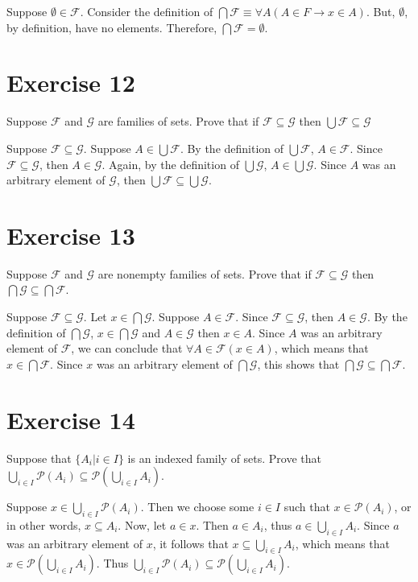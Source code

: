 \documentclass[11pt]{article}
\newcommand{\then}{\rightarrow}
\newcommand{\powerset}[1]{\mathscr{P}(#1)}
\newcommand{\family}[1]{\mathcal{#1}}
\begin{document}
Suppose $\emptyset \in \family{F}$. Consider the definition of 
$\bigcap \family{F} \equiv \forall A (A \in F \then x \in A)$. But, $\emptyset$, 
by definition, have no elements. Therefore, $\bigcap \family{F} = \emptyset$.

\section*{Exercise 12}

Suppose $\family{F}$ and $\family{G}$ are families of sets. Prove that if
$\family{F} \subseteq \family{G}$ then $\bigcup \family{F} \subseteq \family{G}$

Suppose $\family{F} \subseteq \family{G}$. Suppose $A \in \bigcup \family{F}$.
By the definition of $\bigcup \family{F}$, $A \in \family{F}$. Since 
$\family{F} \subseteq \family{G}$, then $A \in \family{G}$. Again, by the
definition of $\bigcup \family{G}$, $A \in \bigcup \family{G}$. Since $A$ was an 
arbitrary element of $\family{G}$, then 
$\bigcup \family{F} \subseteq \bigcup \family{G}$.

\section*{Exercise 13}

Suppose $\family{F}$ and $\family{G}$ are nonempty families of sets. Prove that 
if $\family{F} \subseteq \family{G}$ then 
$\bigcap \family{G} \subseteq \bigcap \family{F}$.

Suppose $\family{F} \subseteq \family{G}$. Let $x \in \bigcap \family{G}$.
Suppose $A \in \family{F}$. Since $\family{F} \subseteq \family{G}$, then 
$A \in \family{G}$. By the definition of $\bigcap \family{G}$, 
$x \in \bigcap \family{G}$ and $A \in \family{G}$ then $x \in A$. Since $A$ was 
an arbitrary element of $\family{F}$, we can conclude that 
$\forall A \in \family{F} (x \in A)$, which means that $x \in \bigcap \family{F}$.
Since $x$ was an arbitrary element of $\bigcap \family{G}$, this shows that 
$\bigcap \family{G} \subseteq \bigcap \family{F}$.

\section*{Exercise 14}

Suppose that $\{A_i | i \in I\}$ is an indexed family of sets. Prove that 
$\bigcup_{i \in I} \powerset{A_i} \subseteq \powerset{\bigcup_{i \in I} A_i}$.

Suppose $x \in \bigcup_{i \in I} \powerset{A_i}$. Then we choose some $i \in I$ 
such that $x \in \powerset{A_i}$, or in other words, $x \subseteq A_i$.
Now, let $a \in x$. Then $a \in A_i$, thus $a \in \bigcup_{i \in I} A_i$.
Since $a$ was an arbitrary element of $x$, it follows that 
$x \subseteq \bigcup_{i \in I} A_i$, which means that 
$x \in \powerset{\bigcup_{i \in I} A_i}$. Thus 
$\bigcup_{i \in I} \powerset{A_i} \subseteq \powerset{\bigcup_{i \in I} A_i}$.
\end{document}
